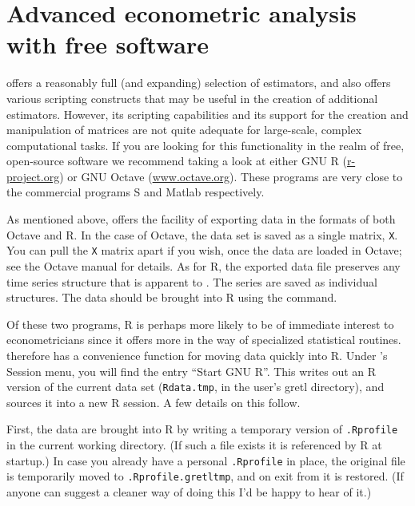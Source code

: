 \chapter{Advanced econometric analysis with free software}
\label{app-advanced}

 offers a reasonably full (and expanding) selection of
estimators, and also offers various scripting constructs that may be
useful in the creation of additional estimators. However, its
scripting capabilities and its support for the creation and
manipulation of matrices are not quite adequate for large-scale,
complex computational tasks.  If you are looking for this
functionality in the realm of free, open-source software we recommend
taking a look at either GNU R
(\href{http://www.r-project.org/}{r-project.org}) or GNU Octave
(\href{http://www.octave.org/}{www.octave.org}).  These programs are
very close to the commercial programs S and Matlab respectively.
  
As mentioned above,  offers the facility of exporting
data in the formats of both Octave and R.  In the case of Octave, the
 data set is saved as a single matrix, \verb+X+. You can
pull the \verb+X+ matrix apart if you wish, once the data are loaded
in Octave; see the Octave manual for details.  As for R, the exported
data file preserves any time series structure that is apparent to
.  The series are saved as individual structures. The data
should be brought into R using the  command.
  
Of these two programs, R is perhaps more likely to be of immediate
interest to econometricians since it offers more in the way of
specialized statistical routines.   therefore has a
convenience function for moving data quickly into R. Under
's Session menu, you will find the entry ``Start GNU R''.
This writes out an R version of the current  data set
(\verb+Rdata.tmp+, in the user's gretl directory), and sources it into
a new R session. A few details on this follow.
  
First, the data are brought into R by writing a temporary version of
\verb+.Rprofile+ in the current working directory.  (If such a file
exists it is referenced by R at startup.)  In case you already have a
personal \verb+.Rprofile+ in place, the original file is temporarily
moved to \verb+.Rprofile.gretltmp+, and on exit from  it is
restored.  (If anyone can suggest a cleaner way of doing this I'd be
happy to hear of it.)
  
